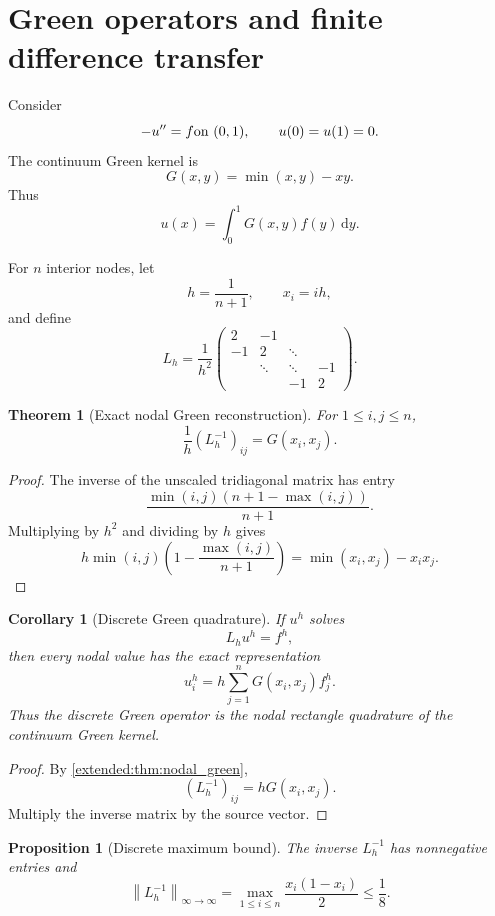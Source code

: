 \documentclass[11pt,letterpaper]{article}
\newtheorem{theorem}{Theorem}[section]
\theoremstyle{plain}
\newtheorem{proposition}[proposition]{Proposition}
\theoremstyle{plain}
\theoremstyle{plain}
\newtheorem{corollary}[corollary]{Corollary}
\theoremstyle{definition}
\theoremstyle{definition}
\theoremstyle{definition}
\theoremstyle{definition}
\theoremstyle{definition}
\theoremstyle{remark}
\theoremstyle{remark}
\theoremstyle{remark}
\theoremstyle{remark}
\theoremstyle{remark}
\newcommand{\norm}[1]{\left\lVert#1\right\rVert}
\theoremstyle{remark}
\newcommand{\dd}{\,\mathrm d}
\let\KomorebiPrimitivemathrm\mathrm
\renewcommand{\mathrm}[1]{{\KomorebiPrimitivemathrm{#1}}}
\begin{document}
\FloatBarrier
\section{Green operators and finite difference transfer}\label{extended:section:12}\label{extended:sec:green_pde}

Consider
\[
-u''=f
\quad\hbox{on }(0,1),
\qquad
u(0)=u(1)=0.
\]
The continuum Green kernel is
\[
G(x,y)=\min(x,y)-xy.
\]
Thus
\[
u(x)=\int_0^1G(x,y)f(y)\dd y.
\]

For \(n\) interior nodes, let
\[
h=\frac{1}{n+1},
\qquad
x_i=ih,
\]
and define
\[
L_h
=
\frac{1}{h^2}
\begin{pmatrix}
2&-1&&\\
-1&2&\ddots&\\
&\ddots&\ddots&-1\\
&&-1&2
\end{pmatrix}.
\]

\begin{theorem}[Exact nodal Green reconstruction]\label{extended:record:075}\label{extended:thm:nodal_green}
For \(1\leq i,j\leq n\),
\[
\frac{1}{h}(L_h^{-1})_{ij}
=
G(x_i,x_j).
\]
\end{theorem}

\begin{proof}
The inverse of the unscaled tridiagonal matrix has entry
\[
\frac{\min(i,j)(n+1-\max(i,j))}{n+1}.
\]
Multiplying by \(h^2\) and dividing by \(h\) gives
\[
h\min(i,j)
\left(1-\frac{\max(i,j)}{n+1}\right)
=
\min(x_i,x_j)-x_ix_j.
\]
\end{proof}

\begin{corollary}[Discrete Green quadrature]\label{extended:record:076}\label{extended:cor:discrete_green_quadrature}
If \(u^h\) solves
\[
L_hu^h=f^h,
\]
then every nodal value has the exact representation
\[
u_i^h
=
h\sum_{j=1}^nG(x_i,x_j)f_j^h.
\]
Thus the discrete Green operator is the nodal rectangle quadrature of the continuum Green kernel.
\end{corollary}

\begin{proof}
By \cref{extended:thm:nodal_green},
\[
(L_h^{-1})_{ij}=hG(x_i,x_j).
\]
Multiply the inverse matrix by the source vector.
\end{proof}

\begin{proposition}[Discrete maximum bound]\label{extended:record:077}\label{extended:prop:discrete_inverse_bound}
The inverse \(L_h^{-1}\) has nonnegative entries and
\[
\norm{L_h^{-1}}_{\infty\to\infty}
=
\max_{1\leq i\leq n}
\frac{x_i(1-x_i)}{2}
\leq
\frac18.
\]
\end{proposition}
\end{document}
